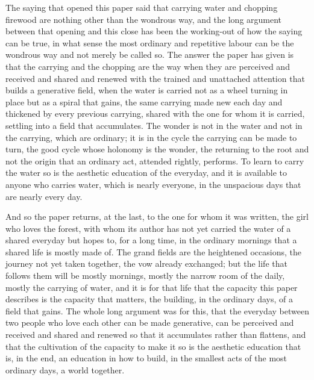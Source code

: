 The saying that opened this paper said that carrying water and chopping firewood are nothing other than the wondrous way, and the long argument between that opening and this close has been the working-out of how the saying can be true, in what sense the most ordinary and repetitive labour can be the wondrous way and not merely be called so. The answer the paper has given is that the carrying and the chopping are the way when they are perceived and received and shared and renewed with the trained and unattached attention that builds a generative field, when the water is carried not as a wheel turning in place but as a spiral that gains, the same carrying made new each day and thickened by every previous carrying, shared with the one for whom it is carried, settling into a field that accumulates. The wonder is not in the water and not in the carrying, which are ordinary; it is in the cycle the carrying can be made to turn, the good cycle whose holonomy is the wonder, the returning to the root and not the origin that an ordinary act, attended rightly, performs. To learn to carry the water so is the aesthetic education of the everyday, and it is available to anyone who carries water, which is nearly everyone, in the unspacious days that are nearly every day.

And so the paper returns, at the last, to the one for whom it was written, the girl who loves the forest, with whom its author has not yet carried the water of a shared everyday but hopes to, for a long time, in the ordinary mornings that a shared life is mostly made of. The grand fields are the heightened occasions, the journey not yet taken together, the vow already exchanged; but the life that follows them will be mostly mornings, mostly the narrow room of the daily, mostly the carrying of water, and it is for that life that the capacity this paper describes is the capacity that matters, the building, in the ordinary days, of a field that gains. The whole long argument was for this, that the everyday between two people who love each other can be made generative, can be perceived and received and shared and renewed so that it accumulates rather than flattens, and that the cultivation of the capacity to make it so is the aesthetic education that is, in the end, an education in how to build, in the smallest acts of the most ordinary days, a world together.
